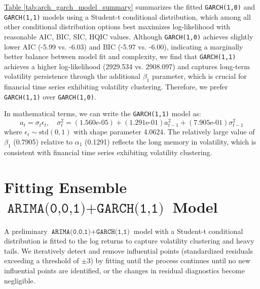 \documentclass{article}
\newcommand{\1}{\mathbbm{1}}
\theoremstyle{definition}
\begin{document}
\hyperref[tab:arch_garch_model_summary]{Table \ref{tab:arch_garch_model_summary}} summarizes the fitted \texttt{GARCH(1,0)} and \texttt{GARCH(1,1)} models using a Student-t conditional distribution, which among all other conditional distribution options best maximizes log-likelihood with reasonable AIC, BIC, SIC, HQIC values. Although \texttt{GARCH(1,0)} achieves slightly lower AIC (-5.99 vs. -6.03) and BIC (-5.97 vs. -6.00), indicating a marginally better balance between model fit and complexity, we find that \texttt{GARCH(1,1)} achieves a higher log-likelihood (2929.534 vs. 2908.097) and captures long-term volatility persistence through the additional $\beta_1$ parameter, which is crucial for financial time series exhibiting volatility clustering. Therefore, we prefer \texttt{GARCH(1,1)} over \texttt{GARCH(1,0)}.

In mathematical terms, we can write the \texttt{GARCH(1,1)} model as:
$$a_t = \sigma_t \epsilon_t, \quad \sigma^2_t = (\text{1.560e-05}) + (\text{1.291e-01})a^2_{t-1} + (\text{7.905e-01})\sigma^2_{t-1}$$
where $\epsilon_t \sim \text{std}(0,1)$ with shape parameter 4.0624. The relatively large value of $\beta_1$ (0.7905) relative to $\alpha_1$ (0.1291) reflects the long memory in volatility, which is consistent with financial time series exhibiting volatility clustering.






\section{Fitting Ensemble $\texttt{ARIMA(0,0,1)}+\texttt{GARCH(1,1)}$ Model}

A preliminary $\texttt{ARIMA(0,0,1)}+\texttt{GARCH(1,1)}$ model with a Student-t conditional distribution is fitted to the log returns to capture volatility clustering and heavy tails. We iteratively detect and remove influential points (standardized residuals exceeding a threshold of $\pm 3$) by fitting until the process continues until no new influential points are identified, or the changes in residual diagnostics become negligible.
\end{document}
